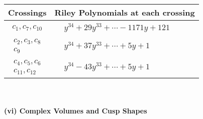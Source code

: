 \documentclass[1p]{elsarticle_modified}
\theoremstyle{definition}
\begin{document}
\begin{tabular}{m{50pt}|m{274pt}}
Crossings & \hspace{64pt}Riley Polynomials at each crossing \\
\hline $$\begin{aligned}c_{1},c_{7},c_{10}\end{aligned}$$&$\begin{aligned}
&y^{34}+29 y^{33}+\cdots-1171 y+121
\end{aligned}$\\
\hline $$\begin{aligned}c_{2},c_{3},c_{8}\\c_{9}\end{aligned}$$&$\begin{aligned}
&y^{34}+37 y^{33}+\cdots+5 y+1
\end{aligned}$\\
\hline $$\begin{aligned}c_{4},c_{5},c_{6}\\c_{11},c_{12}\end{aligned}$$&$\begin{aligned}
&y^{34}-43 y^{33}+\cdots+5 y+1
\end{aligned}$\\
\hline
\end{tabular}\\~\\
\newpage\flushleft \textbf{(vi) Complex Volumes and Cusp Shapes}
\end{document}
